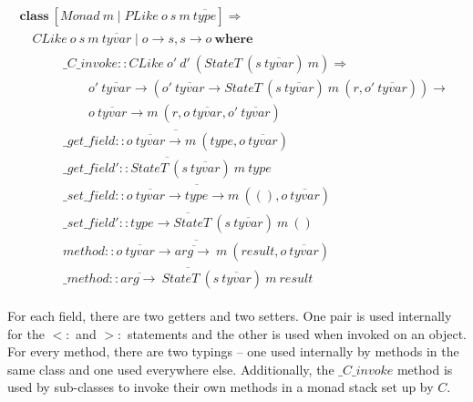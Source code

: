 \documentclass[runningheads,a4paper]{llncs}
\begin{document}
\begin{displaymath}
\begin{array}{l}
\mathbf{class}~[\mathit{Monad}~m \mid \mathit{PLike}~o~s~m~\overline{\mathit{type}}] \Rightarrow \\
\quad \mathit{CLike}~o~s~m~\overline{\mathit{tyvar}} \mid o \to s, s \to o~\mathbf{where} \\
\qquad \quad \begin{array}{l}
\_\mathit{C}\_\mathit{invoke} :: \mathit{CLike}~o'~d'~(\mathit{StateT}~(s~\overline{\mathit{tyvar}})~m) \Rightarrow \\
\qquad o'~\overline{\mathit{tyvar}} \to (o'~\overline{\mathit{tyvar}} \to \mathit{StateT}~(s~\overline{\mathit{tyvar}})~m~(r,o'~\overline{\mathit{tyvar}})) \to\\\qquad
                                  o~\overline{\mathit{tyvar}} \to m~(r,o~\overline{\mathit{tyvar}},o'~\overline{\mathit{tyvar}}) \\
\overline{\_\mathit{get}\_\mathit{field} :: o~\overline{\mathit{tyvar}} \to m~(\mathit{type}, o~\overline{\mathit{tyvar}}) } \\
\overline{\_\mathit{get}\_\mathit{field}' :: \mathit{StateT}~(s~\overline{\mathit{tyvar}})~m~\mathit{type}} \\
\overline{\_\mathit{set}\_\mathit{field} :: o~\overline{\mathit{tyvar}} \to \mathit{type} \to m~((),o~\overline{\mathit{tyvar}})} \\
\overline{\_\mathit{set}\_\mathit{field}' :: \mathit{type} \to \mathit{StateT}~(s~\overline{\mathit{tyvar}})~m~()} \\
\overline{\mathit{method} :: o~\overline{\mathit{tyvar}} \to \overline{\mathit{arg} \to}~m~(\mathit{result},o~\overline{\mathit{tyvar}})}\\
\overline{\_\mathit{method} :: \overline{\mathit{arg} \to}~ \mathit{StateT}~(s~\overline{\mathit{tyvar}})~m~\mathit{result} }
\end{array}
\end{array}
\end{displaymath}

For each field, there are two getters and two setters. One pair is used internally for the $<:$ and $>:$ statements and the other is used when invoked on an object. For every method, there are two typings -- one used internally by methods in the same class and one used everywhere else. Additionally, the $\_\mathit{C}\_\mathit{invoke}$ method is used by sub-classes to invoke their own methods in a monad stack set up by $C$.
\end{document}
